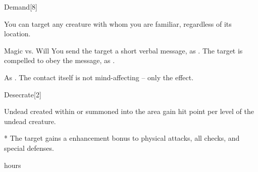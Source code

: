\begin{spellsection}{Demand}[8]
    \begin{spellheader}
    \end{spellheader}
    \begin{spellcontent}
        \begin{spelltargetinginfo}
        \end{spelltargetinginfo}
        \begin{spelleffects}

            \spellspecial You can target any creature with whom you are familiar, regardless of its location.
            \begin{spellattack}{Magic vs. Will}
                \spelleffect You send the target a short verbal message, as .
                \spellsuccess The target is compelled to obey the message, as .
            \end{spellattack}
        \end{spelleffects}
    \end{spellcontent}
    \begin{spellfooter}
        \spellnotes As .
        \spellnotes The contact itself is not mind-affecting -- only the  effect.
    \end{spellfooter}
\end{spellsection}

\begin{spellsection}{Desecrate}[2]
    \begin{spellheader}
    \end{spellheader}
    \begin{spellcontent}
        \begin{spelltargetinginfo}
        \end{spelltargetinginfo}
        \begin{spelleffects}

            \spellline
            \spelleffect Undead created within or summoned into the area gain  hit point per level of the undead creature.
            \begin{spelltarget}*
                \spelleffect The target gains a  enhancement bonus to physical attacks, all checks, and special defenses.
            \end{spelltarget}
             hours
        \end{spelleffects}
    \end{spellcontent}
    \begin{spellfooter}
    \end{spellfooter}
\end{spellsection}

